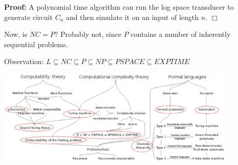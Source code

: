 \documentclass[a4paper,blends,pdf,colorBG,slideColor]{prosper}
\begin{document}

\es

{\small
\ftheorem{
\[
NC \subseteq P
\]}
{\bf Proof:} A polynomial time algorithm can run the log space transducer to generate circuit $C_n$ and then simulate it on an input of length $n$. $\Box$

Now, is $NC = P$?  Probably not, since $P$ contains a number of inherently sequential problems.
}
\es

Observation: $L \subseteq NC \subseteq P \subseteq NP \subseteq PSPACE \subseteq EXPTIME$
\es

\begin{center}
    \includegraphics[height=45mm]{images/course-road-map-00.eps}
\end{center}

\es
\end{document}
